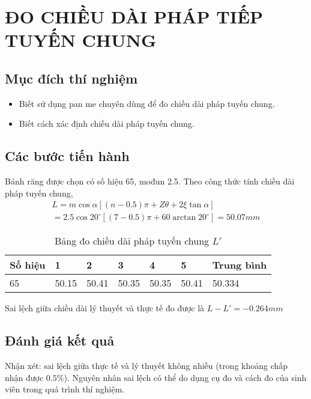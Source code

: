 \chapter{ĐO CHIỀU DÀI PHÁP TIẾP TUYẾN CHUNG}

\section{Mục đích thí nghiệm}
\begin{itemize}
	\item Biết sử dụng pan me chuyên dùng để đo chiều dài pháp tuyến chung.
	\item Biết cách xác định chiều dài pháp tuyến chung.
\end{itemize}

\section{Các bước tiến hành}
Bánh răng được chọn có số hiệu 65, mođun 2.5. Theo công thức tính chiều dài pháp tuyến chung,
\[
\begin{array}{l}
L = m\cos \alpha[(n-0.5)\pi + Z\theta + 2\xi \tan \alpha]\\
= 2.5\cos 20^\circ [(7-0.5)\pi + 60 \arctan20^\circ]=50.07\unit{mm}
\end{array}
\]
\begin{table}[ht]
	\centering
	\caption{Bảng đo chiều dài pháp tuyến chung $ L' $}
	\begin{tabular}{lllllll}\toprule
		Số hiệu & 1 & 2 & 3 & 4 & 5 & Trung bình \\\midrule
		65 & 50.15 & 50.41 & 50.35 & 50.35 & 50.41 & 50.334\\\bottomrule
	\end{tabular}
\end{table}
Sai lệch giữa chiều dài lý thuyết và thực tế đo được là $ L - L'= -0.264\unit{mm} $

\section{Đánh giá kết quả}
Nhận xét: sai lệch giữa thực tế và lý thuyết không nhiều (trong khoảng chấp nhận được $ 0.5\% $). Nguyên nhân sai lệch có thể do dụng cụ đo và cách đo của sinh viên trong quá trình thí nghiệm.
